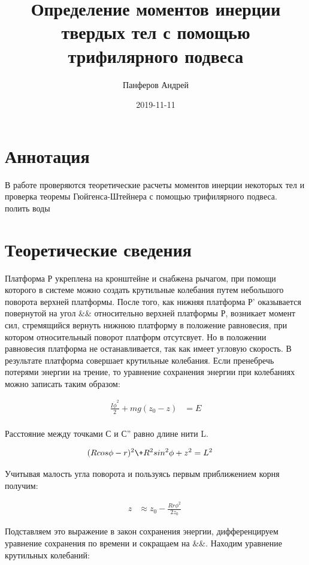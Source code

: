 \documentclass{article}
\title{Определение моментов инерции твердых тел с помощью трифилярного подвеса}
\date{2019-11-11}
\author{Панферов Андрей}
\begin{document}
\topmargin=-10mm
\maketitle
\newpage
{}

\section{Аннотация}
В работе проверяются теоретические расчеты моментов инерции некоторых тел и проверка теоремы Гюйгенса-Штейнера с помощью трифилярного подвеса. \\ полить воды
\section{Теоретические сведения}

Платформа Р укреплена на кронштейне и снабжена рычагом, при помощи которого в системе можно создать крутильные колебания путем небольшого поворота верхней платформы. 
После того, как нижняя платформа Р' оказывается повернутой на угол &{\phi}& относительно верхней платформы Р, возникает момент сил, стремящийся вернуть нижнюю платформу в положение равновесия, при котором относительный поворот платформ отсутсвует. Но в положении равновесия платформа не останавливается, так как имеет угловую скорость. В результате платформа совершает крутильные колебания.
Если пренебречь потерями энергии на трение, то уравнение сохранения энергии при колебаниях можно записать таким образом: 

\begin{align*}
   \frac{I\dot \phi^2}{2} + mg(z_0-z) &= E\\
\end{align*}

Расстояние между точками С и С'' равно длине нити L.

\begin{align*}
   (Rcos\phi - r)^2\+R^2sin^2\phi+z^2 &= L^2\
\end{align*}

Учитывая малость угла поворота и пользуясь первым приближением корня получим:

\begin{align*}
   z &\approx z_0-\frac{Rr\phi^2}{2z_0}\
\end{align*}

Подставляем это выражение в закон сохранения энергии, дифференцируем уравнение сохранения по времени и сокращаем на &{\dot \phi}&. Находим уравнение крутильных колебаний:
\end{document}
